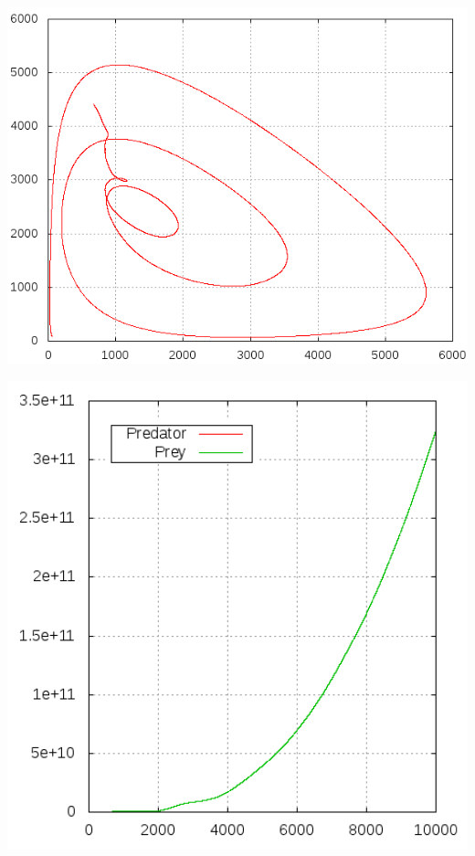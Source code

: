 \documentclass[11pt]{article}
\begin{document}
\begin{minipage}[b]{0.48\textwidth}
\includegraphics[width=1.0\textwidth]{Graphiken/ppm45ham.png}
\end{minipage}
\hfill
\begin{minipage}[b]{0.48\textwidth}
\includegraphics[width=1.0\textwidth]{Graphiken/ppm45abb.png}
\end{minipage}
\end{document}
